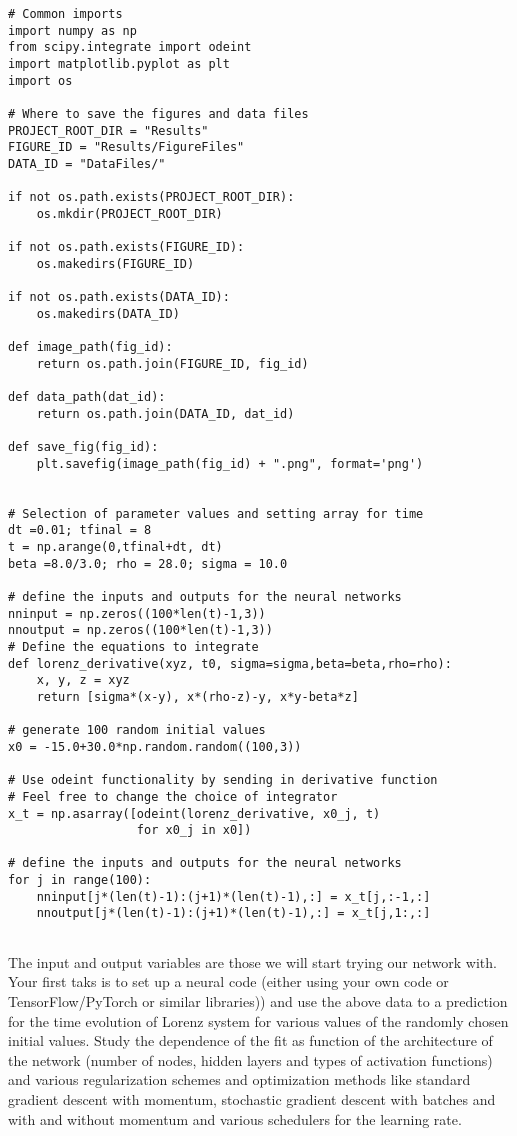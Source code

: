 \documentclass[%
oneside,                 %
final,                   %
10pt]{article}
\begin{document}
\begin{verbatim}
# Common imports
import numpy as np
from scipy.integrate import odeint
import matplotlib.pyplot as plt
import os

# Where to save the figures and data files
PROJECT_ROOT_DIR = "Results"
FIGURE_ID = "Results/FigureFiles"
DATA_ID = "DataFiles/"

if not os.path.exists(PROJECT_ROOT_DIR):
    os.mkdir(PROJECT_ROOT_DIR)

if not os.path.exists(FIGURE_ID):
    os.makedirs(FIGURE_ID)

if not os.path.exists(DATA_ID):
    os.makedirs(DATA_ID)

def image_path(fig_id):
    return os.path.join(FIGURE_ID, fig_id)

def data_path(dat_id):
    return os.path.join(DATA_ID, dat_id)

def save_fig(fig_id):
    plt.savefig(image_path(fig_id) + ".png", format='png')


# Selection of parameter values and setting array for time
dt =0.01; tfinal = 8
t = np.arange(0,tfinal+dt, dt)
beta =8.0/3.0; rho = 28.0; sigma = 10.0

# define the inputs and outputs for the neural networks
nninput = np.zeros((100*len(t)-1,3))
nnoutput = np.zeros((100*len(t)-1,3))
# Define the equations to integrate
def lorenz_derivative(xyz, t0, sigma=sigma,beta=beta,rho=rho):
    x, y, z = xyz
    return [sigma*(x-y), x*(rho-z)-y, x*y-beta*z]

# generate 100 random initial values
x0 = -15.0+30.0*np.random.random((100,3))

# Use odeint functionality by sending in derivative function
# Feel free to change the choice of integrator
x_t = np.asarray([odeint(lorenz_derivative, x0_j, t) 
                  for x0_j in x0])

# define the inputs and outputs for the neural networks
for j in range(100):
    nninput[j*(len(t)-1):(j+1)*(len(t)-1),:] = x_t[j,:-1,:]
    nnoutput[j*(len(t)-1):(j+1)*(len(t)-1),:] = x_t[j,1:,:]


\end{verbatim}


The input and output variables are those we will start trying our
network with. Your first taks is to set up a neural code (either using
your own code or TensorFlow/PyTorch or similar libraries)) and use the
above data to a prediction for the time evolution of Lorenz system for
various values of the randomly chosen initial values.  Study the
dependence of the fit as function of the architecture of the network
(number of nodes, hidden layers and types of activation functions) and
various regularization schemes and optimization methods like standard
gradient descent with momentum, stochastic gradient descent with
batches and with and without momentum and various schedulers for the
learning rate.
\end{document}
